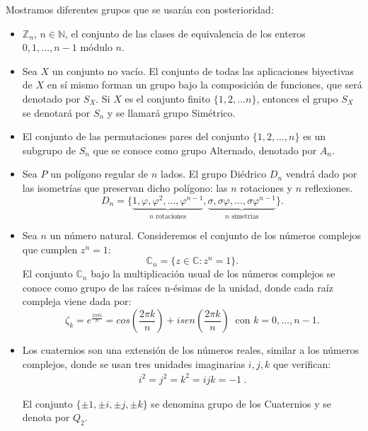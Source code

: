 Mostramos diferentes grupos que se usarán con posterioridad:
\begin{Ejemplo} \label{ejemplosgr}
\hfill
\begin{itemize}
    \item $\mathbb{Z}_n$, $n\in \mathbb{N}$, el conjunto de las clases de equivalencia de los enteros $0,1,\ldots, n-1$ módulo $n$.
    
    \item Sea $X$ un conjunto no vacío. El conjunto de todas las aplicaciones biyectivas  de $X$ en sí mismo forman un grupo bajo la composición de funciones, que será denotado por $S_X$. Si $X$ es el conjunto finito $\{1,2,\ldots n\}$, entonces el grupo $S_X$ se denotará por $S_n$ y se llamará grupo Simétrico.
    
    \item El conjunto de las permutaciones pares del conjunto $\{1,2, \ldots,n\}$ es un subgrupo de $S_n$ que se conoce como grupo Alternado, denotado por $A_n$.

    \item Sea $P$ un polígono regular de $n$ lados. El grupo Diédrico $D_n$ vendrá dado por las isometrías que preservan dicho polígono: las $n$ rotaciones y $n$ reflexiones. 
    \[
    D_n =\{ \underbrace{1,\varphi, \varphi^2,...,\varphi^{n-1}}_{\text{$n$ rotaciones}},
    \underbrace{\sigma, \sigma\varphi,...,\sigma\varphi^{n-1}}_{\text{$n$ simetrías}}\} .
    \]
    
    
    \item Sea $n$ un número natural. Consideremos el conjunto de los números complejos que cumplen $z^n=1$:
    \[
    \mathbb{C}_n = \{ z \in \mathbb{C}: z^n =1    \} .
    \]
    El conjunto $\mathbb{C}_n$ bajo la multiplicación usual de los números complejos se conoce como grupo de las raíces n-ésimas de la unidad, donde cada raíz compleja viene dada por:
    \[
    \zeta_k = e^{\frac{2\pi ki}{n}} = cos(\frac{2\pi k}{n}) + isen(\frac{2\pi k}{n}) \: \text{ con } k = 0,\ldots,n-1 .
    \]

    
    \item Los cuaternios son una extensión de los números reales, similar a los números complejos, donde se usan tres unidades imaginarias $i, j, k$ que verifican:
    \begin{align*}
    i^2 = j^2=k^2 = ijk = -1\: .
    \end{align*}
    
    El conjunto $\{\pm{1}, \pm{i}, \pm{j}, \pm{k} \}$ se denomina grupo de los Cuaternios y se denota por $Q_2$.



\end{itemize}
\end{Ejemplo}




